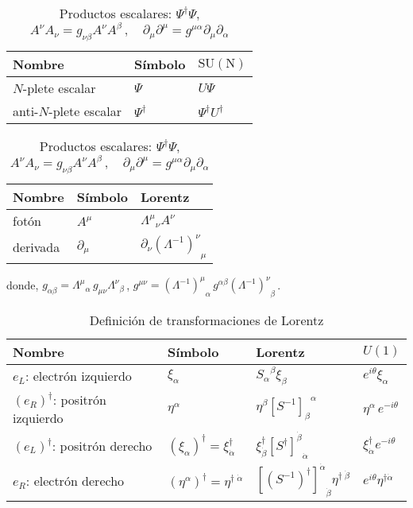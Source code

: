 \begin{frame}

\begin{table}
  \centering
   \begin{tabular}{lll}
    Nombre & Símbolo & $\operatorname{SU(N)}$ \\\hline
    $N$-plete escalar & $\Psi$ & $U \Psi$ \\
    anti-$N$-plete escalar & $\Psi^\dagger $ & $\Psi^\dagger U^\dagger $ \\\hline
    \end{tabular}\hspace{3cm}
   \begin{tabular}{lll}
    Nombre & Símbolo & Lorentz \\\hline
    fotón & $A^\mu$ & ${\Lambda^\mu}_\nu A^\nu$ \\
    derivada & $\partial_\mu$ & $\partial_\nu {\left(\Lambda^{-1}\right)^\nu}_\mu$ \\\hline
  \end{tabular}
  \caption{
       Productos escalares: $\Psi^\dagger \Psi$,  \hspace{4cm}
      $A^\nu A_\nu= g_{\nu \beta}  A^\nu  A^{\beta}\,,\quad \partial_\mu  \partial^\mu=g^{\mu\alpha}\partial_\mu\partial_{\alpha}$
}
  \label{tab:fermionlr}
\end{table}
donde,
 $g_{\alpha\beta}={\Lambda^{\mu}}_{\alpha}\,g_{\mu\nu}{\Lambda^{\nu}}_{\beta}\,$,
  $g^{\mu\nu}={\left( \Lambda^{-1} \right)^{\mu}}_{\alpha}\,g^{\alpha\beta} {\left( \Lambda^{-1} \right)^{\nu}}_{\beta}\,$.


\begin{table}
  \centering
  \begin{tabular}{llll}
    Nombre & Símbolo & Lorentz & $U(1)$\\\hline\hline
    $e_L$: electrón izquierdo & $\xi_{\alpha}$ & ${S_{\alpha}}^{\beta}\xi_{\beta}$ & $e^{i\theta}\xi_\alpha$\\
   $\left( e_R \right)^{\dagger}$: positrón izquierdo&$\eta^{\alpha}$& $\eta^\beta{\left[  S^{-1}  \right]_{\beta}}^{\alpha}$ & $\eta^\alpha\, e^{-i\theta}$\\
    \hline    
    $\left( e_L \right)^{\dagger}$: positrón derecho   & $\left( \xi_{\alpha} \right)^{\dagger}=\xi^{\dagger}_{\dot{\alpha}}$ &
     $\xi^{\dagger}_{\dot{\beta}}{\left[{S^{\dagger}}\right]^{\dot{\beta}}}_{\dot{\alpha}}$ & $\xi^\dagger_{\dot{\alpha}} e^{-i\theta}$\\
   $e_R$: electrón derecho   & $\left( \eta^{\alpha} \right)^{\dagger}=\eta^{\dagger\;\dot{\alpha}}$ & ${\left[ \left( S^{-1} \right)^\dagger \right]^{\dot{\alpha}}}_{\dot{\beta}}\eta^{\dagger\;\dot{\beta}}$& $e^{i\theta}\eta^{\dagger\dot{\alpha}}$ \\\hline\hline
  \end{tabular}
  \caption{Definición de transformaciones de Lorentz}
  \label{tab:fermionlr}
\end{table}


\end{frame}
